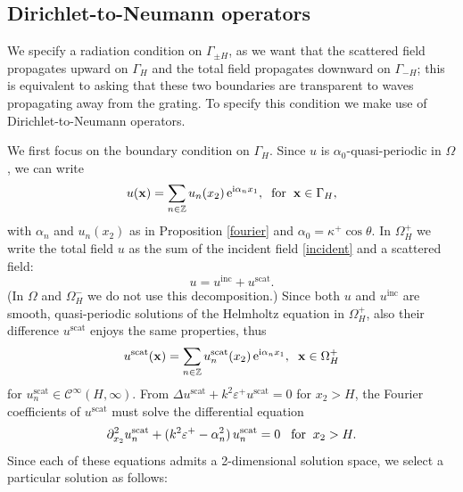 \documentclass[a4paper,10pt]{article}
\newcommand{\bx}{{\mathbf x}}
\newcommand{\ri}{{\mathrm i}}
\newcommand{\re}{{\mathrm e}}
\newcommand{\inc}{{\mathrm{inc}}}
\newcommand{\scat}{{\mathrm{scat}}}
\newcommand{\GH}{{\Gamma_H}}
\newcommand{\GmH}{{\Gamma_{-H}}}
\newcommand{\GpmH}{{\Gamma_{\pm H}}}
\begin{document}
\subsection{Dirichlet-to-Neumann operators}

We specify a radiation condition on $\GpmH$, as we want that the scattered field propagates upward on $\GH$ and the total field propagates downward on $\GmH$; this is equivalent to asking that these two boundaries are transparent to waves propagating away from the grating.
To specify this condition we make use of Dirichlet-to-Neumann operators.

We first focus on the boundary condition on $\GH$. 
Since $u$ is $\alpha_0$-quasi-periodic in $\Omega$, we can write
\begin{equation*}
u(\bx)=\sum_{n\in\mathbb{Z}} u_n(x_2) \, \re^{\ri\alpha_n x_1}, \hspace{0.2cm} \text{for} \hspace{0.2cm} 
\bx\in \GH,
\end{equation*}
with $\alpha_n$ and $u_n(x_2)$ as in Proposition \ref{fourier} and $\alpha_0=\kappa^+\cos\theta$. 
In $\Omega_H^+$ we write the total field $u$ as the sum of the incident field \eqref{incident} and a scattered field:
\begin{equation*}
u = u^\inc+u^\scat.
\end{equation*}
(In $\Omega$ and $\Omega_H^-$ we do not use this decomposition.)
Since both $u$ and $u^\inc$ are smooth, quasi-periodic solutions of the Helmholtz equation in $\Omega_H^+$, also their difference $u^\scat$ enjoys the same properties, thus
\begin{equation*}
u^\scat(\bx)=\sum_{n\in\mathbb{Z}} u^\scat_n(x_2) \, \re^{\ri\alpha_n x_1}, \hspace{0.2cm} \bx\in \Omega_H^+
\end{equation*}
for $u^\scat_n\in \mathcal C^\infty(H,\infty)$. From
$\Delta u^\scat + k^2 \varepsilon^+ u^\scat = 0$ for $x_2 > H$, the Fourier coefficients of $u^\scat$ must solve the differential equation
\begin{equation*}
{\partial^2_{x_2} u^\scat_n} + (k^2 \varepsilon^+ - \alpha^2_n) \, u^\scat_n = 0 \hspace{0.3cm} \text{for}
\hspace{0.2cm} x_2 > H.
\end{equation*}
Since each of these equations admits a 2-dimensional solution space, we select a particular solution as follows:
\end{document}
